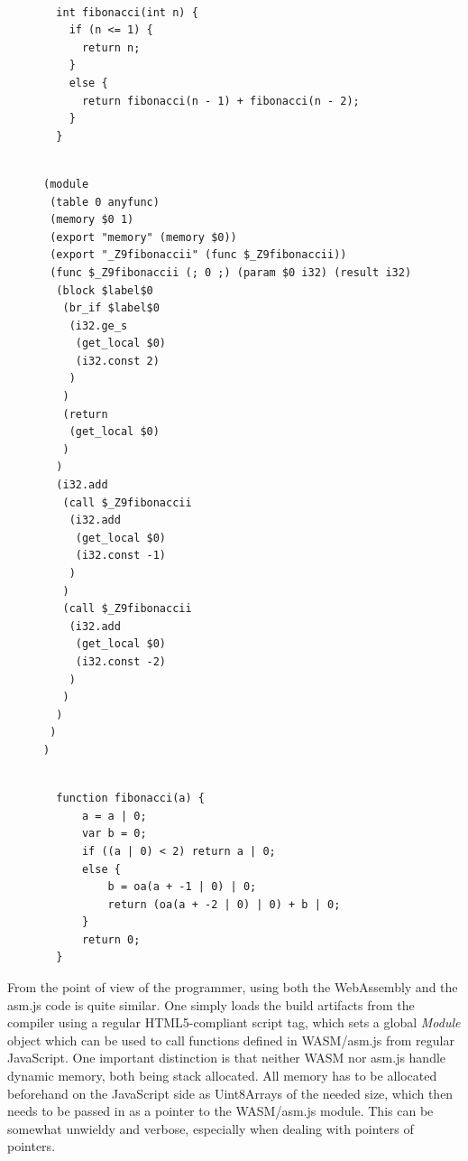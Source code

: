 \documentclass[conference]{IEEEtran}
\begin{document}
\begin{figure}[h]
  \begin{minipage}[t]{0.30\textwidth}
  \begin{lstlisting}[caption={Nth Fibonacci (C++)},label=cfibo, basicstyle=\scriptsize]

  int fibonacci(int n) {
    if (n <= 1) {
      return n;
    }
    else {
      return fibonacci(n - 1) + fibonacci(n - 2);
    }
  }
  \end{lstlisting}
\end{minipage}%
\begin{minipage}[t]{0.40\textwidth}
  \begin{lstlisting}[caption={Nth Fibonacci (WASM)},label=wasmfibo, basicstyle=\scriptsize]

(module
 (table 0 anyfunc)
 (memory $0 1)
 (export "memory" (memory $0))
 (export "_Z9fibonaccii" (func $_Z9fibonaccii))
 (func $_Z9fibonaccii (; 0 ;) (param $0 i32) (result i32)
  (block $label$0
   (br_if $label$0
    (i32.ge_s
     (get_local $0)
     (i32.const 2)
    )
   )
   (return
    (get_local $0)
   )
  )
  (i32.add
   (call $_Z9fibonaccii
    (i32.add
     (get_local $0)
     (i32.const -1)
    )
   )
   (call $_Z9fibonaccii
    (i32.add
     (get_local $0)
     (i32.const -2)
    )
   )
  )
 )
)
  \end{lstlisting}
\end{minipage}%
\begin{minipage}[t]{0.30\textwidth}
  \begin{lstlisting}[caption={Nth Fibonacci (asm.js)},label=asmfibo, basicstyle=\scriptsize]

  function fibonacci(a) {
      a = a | 0;
      var b = 0;
      if ((a | 0) < 2) return a | 0;
      else {
          b = oa(a + -1 | 0) | 0;
          return (oa(a + -2 | 0) | 0) + b | 0;
      }
      return 0;
  }
  \end{lstlisting}
\end{minipage}
\end{figure}

From the point of view of the programmer, using both the WebAssembly and the
asm.js code is quite similar. One simply loads the build artifacts from the
compiler using a regular HTML5-compliant script tag, which sets a global
\emph{Module} object which can be used to call functions defined in WASM/asm.js
from regular JavaScript. One important distinction is that neither WASM nor
asm.js handle dynamic memory, both being stack allocated. All memory has to be
allocated beforehand on the JavaScript side as Uint8Arrays of the needed size,
which then needs to be passed in as a pointer to the WASM/asm.js module. This
can be somewhat unwieldy and verbose, especially when dealing with pointers of
pointers.
\end{document}
